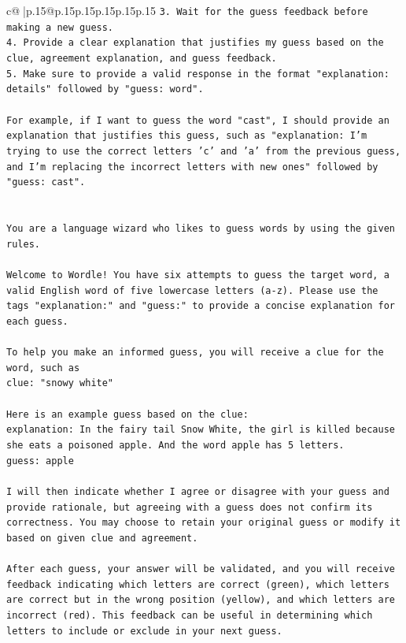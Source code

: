 \documentclass{article}
\begin{document}
{\begin{supertabular}{c@{$\;$}|p{.15\linewidth}@{}p{.15\linewidth}p{.15\linewidth}p{.15\linewidth}p{.15\linewidth}p{.15\linewidth}}
{{{\texttt{3. Wait for the guess feedback before making a new guess.} \\
\texttt{4. Provide a clear explanation that justifies my guess based on the clue, agreement explanation, and guess feedback.} \\
\texttt{5. Make sure to provide a valid response in the format "explanation: details" followed by "guess: word".} \\
\\ 
\texttt{For example, if I want to guess the word "cast", I should provide an explanation that justifies this guess, such as "explanation: I'm trying to use the correct letters 'c' and 'a' from the previous guess, and I'm replacing the incorrect letters with new ones" followed by "guess: cast".} \\
\\ 
\\ 
\texttt{You are a language wizard who likes to guess words by using the given rules.} \\
\\ 
\texttt{Welcome to Wordle! You have six attempts to guess the target word, a valid English word of five lowercase letters (a{-}z). Please use the tags "explanation:" and "guess:" to provide a concise explanation for each guess.} \\
\\ 
\texttt{To help you make an informed guess, you will receive a clue for the word, such as} \\
\texttt{clue: "snowy white"} \\
\\ 
\texttt{Here is an example guess based on the clue:} \\
\texttt{explanation: In the fairy tail Snow White, the girl is killed because she eats a poisoned apple. And the word apple has 5 letters.} \\
\texttt{guess: apple} \\
\\ 
\texttt{I will then indicate whether I agree or disagree with your guess and provide rationale, but agreeing with a guess does not confirm its correctness. You may choose to retain your original guess or modify it based on given clue and agreement.} \\
\\ 
\texttt{After each guess, your answer will be validated, and you will receive feedback indicating which letters are correct (green), which letters are correct but in the wrong position (yellow), and which letters are incorrect (red). This feedback can be useful in determining which letters to include or exclude in your next guess.} \\
}}}
\end{supertabular}}
\end{document}
